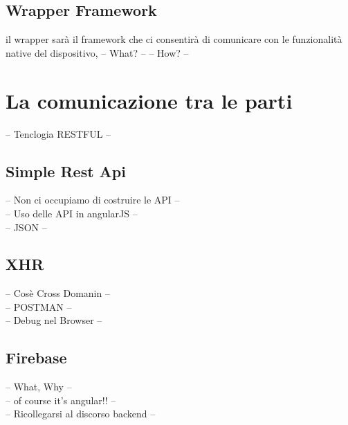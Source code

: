 \subsection{Wrapper Framework}
il wrapper sarà il framework che ci consentirà di comunicare con le funzionalità native del dispositivo,
	-- What? --
	-- How? --
\section{La comunicazione tra le parti}
-- Tenclogia RESTFUL --\\
\subsection{Simple Rest Api}
-- Non ci occupiamo di costruire le API --\\
-- Uso delle API in angularJS --\\
-- JSON --\\
\subsection{XHR}
-- Cosè Cross Domanin --\\
-- POSTMAN --\\
-- Debug nel Browser --\\
\subsection{Firebase}
-- What, Why --\\
-- of course it's angular!! --\\
-- Ricollegarsi al discorso backend --

